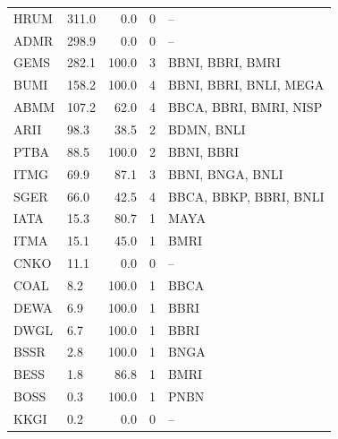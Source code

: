 \begin{longtable}{p{1.2cm}p{4.5cm}rrp{4.5cm}}
HRUM  & 311.0 & 0.0  & 0 & -- \\
ADMR  & 298.9 & 0.0  & 0 & -- \\
GEMS  & 282.1 & 100.0 & 3 & BBNI, BBRI, BMRI \\
BUMI  & 158.2 & 100.0 & 4 & BBNI, BBRI, BNLI, MEGA \\
ABMM  & 107.2 & 62.0 & 4 & BBCA, BBRI, BMRI, NISP \\
ARII  & 98.3  & 38.5 & 2 & BDMN, BNLI \\
PTBA  & 88.5  & 100.0 & 2 & BBNI, BBRI \\
ITMG  & 69.9  & 87.1 & 3 & BBNI, BNGA, BNLI \\
SGER  & 66.0  & 42.5 & 4 & BBCA, BBKP, BBRI, BNLI \\
IATA  & 15.3  & 80.7 & 1 & MAYA \\
ITMA  & 15.1  & 45.0 & 1 & BMRI \\
CNKO  & 11.1  & 0.0  & 0 & -- \\
COAL  & 8.2   & 100.0 & 1 & BBCA \\
DEWA  & 6.9   & 100.0 & 1 & BBRI \\
DWGL  & 6.7   & 100.0 & 1 & BBRI \\
BSSR  & 2.8   & 100.0 & 1 & BNGA \\
BESS  & 1.8   & 86.8 & 1 & BMRI \\
BOSS  & 0.3   & 100.0 & 1 & PNBN \\
KKGI  & 0.2   & 0.0  & 0 & -- \\
\end{longtable}

